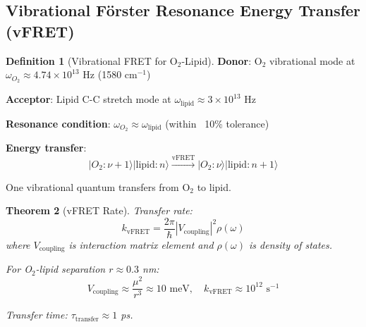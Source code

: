 \documentclass[11pt,a4paper]{article}
\newtheorem{theorem}{Theorem}[section]
\theoremstyle{definition}
\newtheorem{definition}[theorem]{Definition}
\theoremstyle{remark}
\begin{document}
\subsection{Vibrational Förster Resonance Energy Transfer (vFRET)}

\begin{definition}[Vibrational FRET for O$_2$-Lipid]
\textbf{Donor}: O$_2$ vibrational mode at $\omega_{O_2} \approx 4.74 \times 10^{13}$ Hz (1580 cm$^{-1}$)

\textbf{Acceptor}: Lipid C-C stretch mode at $\omega_{\text{lipid}} \approx 3 \times 10^{13}$ Hz

\textbf{Resonance condition}: $\omega_{O_2} \approx \omega_{\text{lipid}}$ (within ~10\% tolerance)

\textbf{Energy transfer}:
\begin{equation}
|O_2: \nu+1\rangle |\text{lipid}: n\rangle \xrightarrow{\text{vFRET}} |O_2: \nu\rangle |\text{lipid}: n+1\rangle
\end{equation}

One vibrational quantum transfers from O$_2$ to lipid.
\end{definition}

\begin{theorem}[vFRET Rate]
Transfer rate:
\begin{equation}
k_{\text{vFRET}} = \frac{2\pi}{\hbar} |V_{\text{coupling}}|^2 \rho(\omega)
\end{equation}
where $V_{\text{coupling}}$ is interaction matrix element and $\rho(\omega)$ is density of states.

For O$_2$-lipid separation $r \approx 0.3$ nm:
\begin{equation}
V_{\text{coupling}} \approx \frac{\mu^2}{r^3} \approx 10 \text{ meV}, \quad k_{\text{vFRET}} \approx 10^{12} \text{ s}^{-1}
\end{equation}

Transfer time: $\tau_{\text{transfer}} \approx 1$ ps.
\end{theorem}
\end{document}

